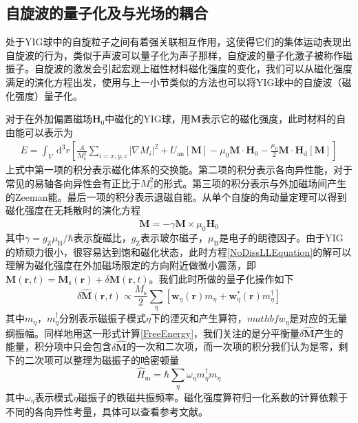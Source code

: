 \subsection{自旋波的量子化及与光场的耦合}
处于YIG球中的自旋粒子之间有着强关联相互作用，这使得它们的集体运动表现出自旋波的行为，类似于声波可以量子化为声子那样，自旋波的量子化激子被称作磁振子。自旋波的激发会引起宏观上磁性材料磁化强度的变化，我们可以从磁化强度满足的演化方程出发，使用与上一小节类似的方法也可以将YIG球中的自旋波（磁化强度）量子化。

对于在外加偏置磁场$\mathbf{H}_0$中磁化的YIG球，用$\mathbf{M}$表示它的磁化强度，此时材料的自由能可以表示为
\begin{equation}
\begin{aligned}
E=\int_{V} \mathrm{~d}^{3} r \left[\frac{A}{M_{\mathrm{s}}^{2}} \sum_{i=x, y, z}\left|\nabla M_{i}\right|^{2}+U_{\mathrm{an}}[\mathbf{M}]-\mu_{0} \mathbf{M} \cdot \mathbf{H}_{0}-\frac{\mu_{0}}{2} \mathbf{M} \cdot \mathbf{H}_{\mathrm{d}}[\mathbf{M}]\right]
\label{FreeEnergy}
\end{aligned}
\end{equation}
上式中第一项的积分表示磁化体系的交换能。第二项的积分表示各向异性能，对于常见的易轴各向异性会有正比于$M_z^2$的形式。第三项的积分表示与外加磁场间产生的Zeeman能。最后一项的积分表示退磁自能。从单个自旋的角动量定理可以得到磁化强度在无耗散时的演化方程
\begin{equation}
\dot{\mathbf{M}}=-\gamma \mathbf{M} \times \mu_{0} \mathbf{H}_{0}
\label{NoDissLLEquation}
\end{equation}
其中$\gamma=g_{\mathrm{Z}} \mu_{\mathrm{B}} / \hbar$表示旋磁比，$g_{\mathrm{Z}}$表示玻尔磁子，$\mu_{\mathrm{B}}$是电子的朗德因子。由于YIG的矫顽力很小，很容易达到饱和磁化状态，此时方程\eqref{NoDissLLEquation}的解可以理解为磁化强度在外加磁场限定的方向附近做微小震荡，即$\mathbf{M}(\mathbf{r},t)=\mathbf{M}_{\mathrm{s}}(\mathbf{r})+\delta \mathbf{M}(\mathbf{r}, t)$。我们此时所做的量子化操作如下
\begin{equation}
\delta \hat{\mathbf{M}}(\mathbf{r}, t) \propto \frac{M_{\mathrm{s}}}{2} \sum_{\eta}\left[\mathbf{w}_{\eta}(\mathbf{r}) {m}_{\eta}+\mathbf{w}_{\eta}^{*}(\mathbf{r}) {m}_{\eta}^{\dagger}\right]
\label{MOperator}
\end{equation}
其中${m}_{\eta}$，${m}_{\eta}^{\dagger}$分别表示磁振子模式$\eta$下的湮灭和产生算符，$mathbf{w}_{\eta}$是对应的无量纲振幅。同样地用这一形式计算\eqref{FreeEnergy}，我们关注的是分平衡量$\delta \hat{\mathbf{M}}$产生的能量，积分项中只会包含$\delta \hat{\mathbf{M}}$的一次和二次项，而一次项的积分我们认为是零，剩下的二次项可以整理为磁振子的哈密顿量
\begin{equation}
\hat{H}_{\mathrm{m}}=\hbar \sum_{\eta} \omega_{\eta} {m}_{\eta}^{\dagger} {m}_{\eta}
\end{equation}
其中$\omega_{\eta}$表示模式${\eta}$磁振子的铁磁共振频率。磁化强度算符归一化系数的计算依赖于不同的各向异性考量，具体可以查看参考文献。

